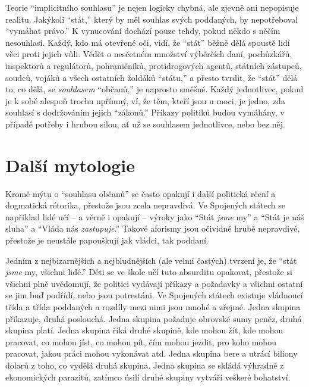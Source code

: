 \documentclass{book}
\begin{document}
Teorie \enquote{implicitního souhlasu} je nejen logicky chybná, ale zjevně ani nepopisuje realitu. Jakýkoli \enquote{stát,} který by měl souhlas svých poddaných, by nepotřeboval \enquote{vymáhat právo.} K vynucování dochází pouze tehdy, pokud někdo s něčím nesouhlasí. Každý, kdo má otevřené oči, vidí, že \enquote{stát} běžně dělá spoustě lidí věci proti jejich vůli. Vědět o nesčetném množství výběrčích daní, pochůzkářů, inspektorů a regulátorů, pohraničníků, protidrogových agentů, státních zástupců, soudců, vojáků a všech ostatních žoldáků \enquote{státu,} a přesto tvrdit, že \enquote{stát} dělá to, co dělá, se \emph{souhlasem} \enquote{občanů,} je naprosto směšné. Každý jednotlivec, pokud je k sobě alespoň trochu upřímný, ví, že těm, kteří jsou u moci, je jedno, zda souhlasí s dodržováním jejich \enquote{zákonů.} Příkazy politiků budou vymáhány, v případě potřeby i hrubou silou, ať už se souhlasem jednotlivce, nebo bez něj.

\section{Další mytologie}

Kromě mýtu o \enquote{souhlasu občanů} se často opakují i další politická rčení a dogmatická rétorika, přestože jsou zcela nepravdivá. Ve Spojených státech se například lidé učí -- a věrně i opakují -- výroky jako \enquote{Stát \emph{jsme} my} a \enquote{Stát je náš sluha} a \enquote{Vláda nás \emph{zastupuje}.} Takové aforismy jsou očividně hrubě nepravdivé, přestože je neustále papouškují jak vládci, tak poddaní.

Jedním z nejbizarnějších a nejbludnějších (ale velmi častých) tvrzení je, že \enquote{stát \emph{jsme} my, všichni lidé.} Děti se ve škole učí tuto absurditu opakovat, přestože si všichni plně uvědomují, že politici vydávají příkazy a požadavky a všichni ostatní se jim buď podřídí, nebo jsou potrestáni. Ve Spojených státech existuje vládnoucí třída a třída poddaných a rozdíly mezi nimi jsou mnohé a zřejmé. Jedna skupina přikazuje, druhá poslouchá. Jedna skupina požaduje obrovské sumy peněz, druhá skupina platí. Jedna skupina říká druhé skupině, kde mohou žít, kde mohou pracovat, co mohou jíst, co mohou pít, čím mohou jezdit, pro koho mohou pracovat, jakou práci mohou vykonávat atd. Jedna skupina bere a utrácí biliony dolarů z toho, co vydělá druhá skupina. Jedna skupina se skládá výhradně z ekonomických parazitů, zatímco úsilí druhé skupiny vytváří veškeré bohatství.
\end{document}
